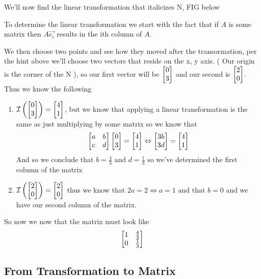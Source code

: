 \documentclass[11pt]{book}
\begin{document}
\begin{ex}
    We'll now find the linear transformation that italicizes N, FIG below

    To determine the linear transformation we start with the fact that if $A$ is some matrix then $A \vec{e_i} $ results in the ith column of $A$.

    We then choose two points and see how they moved after the transormation, per the hint above we'll choose two vectors that reside on the x, y axis. ( Our origin is the corner of the N ), so our first vector will be $\begin{bmatrix} 0 \\ 3 \end{bmatrix}$ and our second is $\begin{bmatrix} 2 \\ 0 \end{bmatrix}$. Thus we know the following
    \begin{enumerate}
        \item $\mathcal{I}\left(\begin{bmatrix} 0 \\ 3 \end{bmatrix}\right) = \begin{bmatrix} 4 \\ 1 \end{bmatrix}$, but we know that applying a linear transformation is the same as just multiplying by some matrix so we know that
            \begin{equation*}
                \begin{bmatrix} a & b \\ c & d \end{bmatrix} \begin{bmatrix} 0 \\ 3 \end{bmatrix} = \begin{bmatrix} 4 \\ 1 \end{bmatrix} \Leftrightarrow \begin{bmatrix} 3b \\ 3d \end{bmatrix} = \begin{bmatrix} 4 \\ 1 \end{bmatrix}
            \end{equation*}
            And so we conclude that $b = \frac{4}{3} \text{ and } d = \frac{1}{3}$ so we've determined the first column of the matrix
        \item $\mathcal{I}\left(\begin{bmatrix} 2 \\ 0 \end{bmatrix}\right) = \begin{bmatrix} 2 \\ 0 \end{bmatrix}$ thus we know that $2a = 2 \Leftrightarrow a = 1 \text{ and that } b = 0$ and we have our second column of the matrix.
    \end{enumerate}
    So now we now that the matrix must look like
    \begin{equation*}
        \begin{bmatrix} 1 & \frac{4}{3} \\ 0 & \frac{1}{3} \end{bmatrix}                      
    \end{equation*}
\end{ex}

\subsection{From Transformation to Matrix}%
\label{sub:from_transformation_to_matrix}
\end{document}
